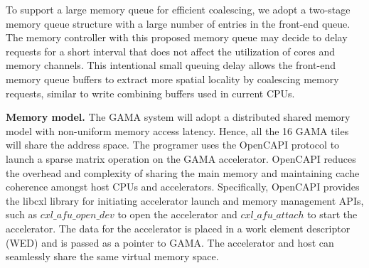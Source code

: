 To support a large memory queue for efficient coalescing, 
we adopt a two-stage memory queue structure with a large number of entries in the front-end queue. 
The memory controller with this proposed  memory queue may decide to delay requests for a short interval that does not affect the utilization of cores and memory channels. 
This intentional small queuing delay allows the front-end memory queue buffers to  extract more spatial locality by coalescing memory requests, similar to write combining buffers used in current CPUs.  

\vspace{3pt}
\noindent
\textbf{Memory model.} 
The GAMA system will adopt a distributed shared memory model with non-uniform memory access latency. 
Hence, all the 16 GAMA tiles will share the address space. 
The programer uses the OpenCAPI protocol to launch a sparse matrix operation on the GAMA accelerator. 
OpenCAPI reduces the overhead and complexity of sharing the main memory and maintaining cache coherence amongst host CPUs and accelerators.
Specifically, OpenCAPI provides the libcxl library for initiating accelerator launch and memory management APIs, such as $cxl\_afu\_open\_dev$ to open the accelerator and $cxl\_afu\_attach$ to start the accelerator. 
The data for the accelerator is placed in a work element descriptor (WED) and is passed as a pointer to GAMA. 
The accelerator and host can seamlessly share the same virtual memory space. 

